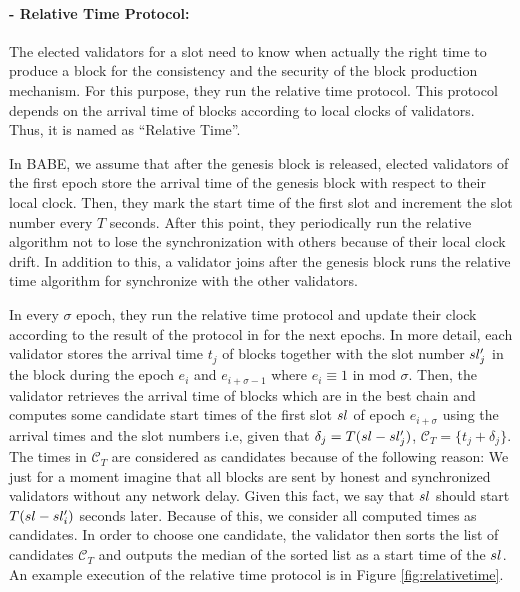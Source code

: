 


\paragraph{- Relative Time Protocol:}



The elected validators for a slot need to know  when actually the right time to produce a block for the consistency and the security of the block production mechanism. For this purpose, they run the relative time protocol. This protocol depends on the arrival time of blocks according to local clocks of validators. Thus, it is named as ``Relative Time''.


In BABE, we assume that after the genesis block is released, elected validators of the first epoch store the arrival time of the genesis block with respect to their local clock. Then, they mark the start time of the first slot and increment the slot number every $ T $ seconds. After this point,  they periodically run the relative algorithm not to lose the synchronization with others because of their local clock drift.  In addition to this, a validator joins after the genesis block runs the relative time algorithm for synchronize with the other validators.

In every $\sigma$ epoch, they run the relative time protocol and update their clock according to the result of the protocol in for the next epochs. 
In more detail, each validator  stores  the arrival time $ t_j $ of  blocks together with the slot number $sl'_j$ in the block during the epoch $ e_i $ and $ e_{i+\sigma-1} $ where $ e_i \equiv 1 $ in mod $ \sigma $. Then, the validator retrieves the arrival time of blocks which are in the best chain and computes some candidate start times of the first slot $ sl $ of epoch $e_{i+\sigma}$ using the arrival times and the slot numbers i.e,  given that $ \delta_j = T(sl - sl'_j)  $,  $\mathcal{C}_T = \{t_j+\delta_j \}$. The times in $ \mathcal{C}_T $ are considered as candidates because of the following reason: We just for a moment imagine that  all  blocks are sent by honest and synchronized validators without any network delay. Given this fact, we say that $ sl $ should start $ T(sl - sl'_i) $ seconds later. Because of this,  we consider all computed times as  candidates. In order to  choose one candidate,  the validator then sorts the list of candidates $ \mathcal{C}_T $ and outputs the median of the sorted list as a start time of the $ sl $. An example execution of the relative time protocol is in Figure \ref{fig:relativetime}.


